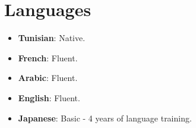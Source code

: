 \documentclass[letterpaper,11pt]{article}
\newcommand{\resumeItem}[2]{
  \item\small{
    \textbf{#1}{: #2 \vspace{-2pt}}
  }
}
\newcommand{\resumeSubItem}[2]{\resumeItem{#1}{#2}\vspace{-4pt}}
\newcommand{\resumeSubHeadingListStart}{\begin{itemize}[leftmargin=*]}
\newcommand{\resumeSubHeadingListEnd}{\end{itemize}}
\begin{document}
\section{Languages}

  \resumeSubHeadingListStart
    \resumeSubItem{Tunisian}
      {Native.}
    \resumeSubItem{French}
      {Fluent.}
    \resumeSubItem{Arabic}
      {Fluent.}
    \resumeSubItem{English}
      {Fluent.}
    \resumeSubItem{Japanese}
      {Basic - 4 years of language training.}
  \resumeSubHeadingListEnd

\end{document}
